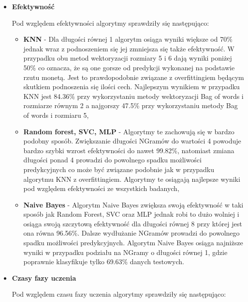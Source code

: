 \begin{itemize}
    \item \textbf{Efektywność}
    
    Pod względem efektywności algorytmy sprawdziły się następująco:
    \begin{itemize}
        \item \textbf{KNN} -
        Dla długości równej 1 algorytm osiąga wyniki większe od 70\% jednak wraz 
        z podnoszeniem się jej zmniejsza się także efektywność. W przypadku obu metod 
        wektoryzacji rozmiary 5 i 6 dają wyniki poniżej 50\% co oznacza, że są one gorsze 
        od predykcji wykonanej na podstawie rzutu monetą. Jest to prawdopodobnie związane 
        z overfittingiem będącym skutkiem podnoszenia się ilości cech. Najlepszym wynikiem w 
        przypadku KNN jest 84.36\% przy wykorzystaniu metody wektoryzacji Bag of words i rozmiarze równym 2
        a najgorszy 47.5\%  przy wykorzystaniu metody Bag of words i rozmiaru 5,

        \item \textbf{Random forest, SVC, MLP} -        
        Algorytmy te zachowują się w bardzo podobny sposób. Zwiększanie długości NGramów 
        do wartości 4 powoduje bardzo szybki wzrost efektywności do nawet 99.82\%, natomiast zmiana 
        długości ponad 4 prowadzi do powolnego spadku możliwości predykcyjnych co może być 
        związane podobnie jak w przypadku algorytmu KNN z overfittingiem. Algorytmy te osiągają najlepsze 
        wyniki pod względem efektywności ze wszystkich badanych,
        \item \textbf{Naive Bayes} -
        Algorytm Naive Bayes zwiększa swoją efektywność w taki sposób jak Random Forest, SVC oraz MLP 
        jednak robi to dużo wolniej i osiąga swoją szczytową efektywność dla długości równej 8 przy której 
        jest ona równa 96.56\%. Dalsze wydłużanie NGramów prowadzi do powolnego spadku możliwości predykcyjnych.
        Algorytm Naive Bayes osiąga najniższe wyniki w przypadku podziału na NGramy o długości równej 1, gdzie 
        poprawnie klasyfikuje tylko 69.63\% danych testowych.
    \end{itemize}
    \item \textbf{Czasy fazy uczenia}
    
    Pod względem czasu fazy uczenia algorytmy sprawdziły się następująco:
    

\end{itemize}
